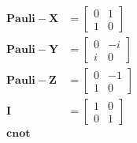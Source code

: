 \documentclass{article}
\begin{document}
\begin{multicols}{2}
    \begin{align*}
        \mathbf{Pauli-X} &= \begin{bmatrix}
                                0 & 1 \\
                                1 & 0
                            \end{bmatrix}\\
    \mathbf{Pauli-Y} &= \begin{bmatrix}
                                0 & -i \\
                                i & 0
                            \end{bmatrix}\\
    \mathbf{Pauli-Z} &= \begin{bmatrix}
                                0 & -1 \\
                                1 & 0
                            \end{bmatrix}\\
    \mathbf{I} &= \begin{bmatrix}
                                1 & 0 \\
                                0 & 1
                            \end{bmatrix}\\
    \mathbf{cnot}
    \end{align*}

\end{multicols}
\end{document}
